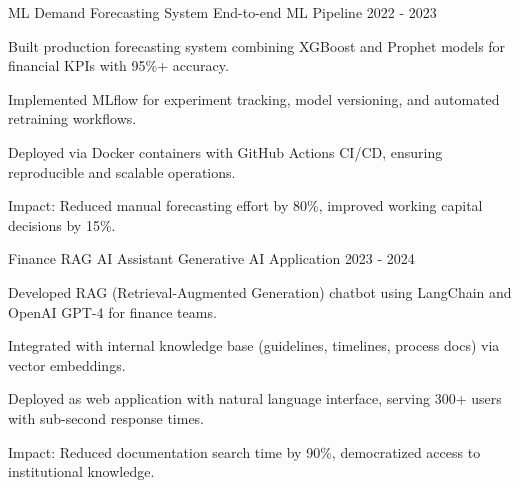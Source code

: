 

\begin{cventries}
\cventry
  {ML Demand Forecasting System} %
  {End-to-end ML Pipeline} %
  {} %
  {2022 - 2023} %
  {
    \begin{cvitems} %
      \item {Built production forecasting system combining XGBoost and Prophet models for financial KPIs with 95\%+ accuracy.}
      \item {Implemented MLflow for experiment tracking, model versioning, and automated retraining workflows.}
      \item {Deployed via Docker containers with GitHub Actions CI/CD, ensuring reproducible and scalable operations.}
      \item {Impact: Reduced manual forecasting effort by 80\%, improved working capital decisions by 15\%.}
    \end{cvitems} 
  }

\cventry
  {Finance RAG AI Assistant} %
  {Generative AI Application} %
  {} %
  {2023 - 2024} %
  {
    \begin{cvitems} %
      \item {Developed RAG (Retrieval-Augmented Generation) chatbot using LangChain and OpenAI GPT-4 for finance teams.}
      \item {Integrated with internal knowledge base (guidelines, timelines, process docs) via vector embeddings.}
      \item {Deployed as web application with natural language interface, serving 300+ users with sub-second response times.}
      \item {Impact: Reduced documentation search time by 90\%, democratized access to institutional knowledge.}
    \end{cvitems} 
  }


\end{cventries}
